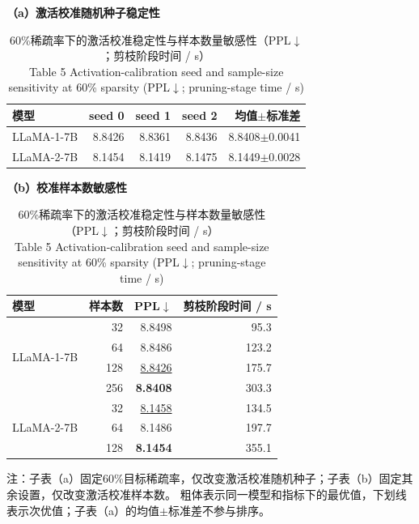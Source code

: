 \documentclass[UTF8,fontset=fandol]{ctexart}
\renewcommand{\arraystretch}{1.08}
\newcommand{\best}[1]{\textbf{#1}}
\newcommand{\second}[1]{\underline{#1}}
\begin{document}
\begin{table}[!htbp]
\centering
\caption{60\%稀疏率下的激活校准稳定性与样本数量敏感性（PPL$\downarrow$；剪枝阶段时间 / s）\\
Table 5 Activation-calibration seed and sample-size sensitivity at 60\% sparsity (PPL$\downarrow$; pruning-stage time / s)}
\label{tab:stability}
\begin{minipage}{0.47\textwidth}
\centering
\scriptsize
\textbf{（a）激活校准随机种子稳定性}\par\vspace{2pt}
\setlength{\tabcolsep}{3.2pt}
\renewcommand{\arraystretch}{0.98}
\begin{tabular}{lrrrr}
\toprule
模型 & seed 0 & seed 1 & seed 2 & 均值$\pm$标准差 \\
\midrule
LLaMA-1-7B & 8.8426 & 8.8361 & 8.8436 & 8.8408$\pm$0.0041 \\
LLaMA-2-7B & 8.1454 & 8.1419 & 8.1475 & 8.1449$\pm$0.0028 \\
\bottomrule
\end{tabular}
\end{minipage}
\hfill
\begin{minipage}{0.49\textwidth}
\centering
\scriptsize
\textbf{（b）校准样本数敏感性}\par\vspace{2pt}
\setlength{\tabcolsep}{4.2pt}
\renewcommand{\arraystretch}{0.96}
\begin{tabular}{lrrr}
\toprule
模型 & 样本数 & PPL$\downarrow$ & 剪枝阶段时间 / s \\
\midrule
\multirow{4}{*}{LLaMA-1-7B}
 & 32  & 8.8498 & 95.3 \\
 & 64  & 8.8486 & 123.2 \\
 & 128 & \second{8.8426} & 175.7 \\
 & 256 & \best{8.8408} & 303.3 \\
\midrule
\multirow{3}{*}{LLaMA-2-7B}
 & 32  & \second{8.1458} & 134.5 \\
 & 64  & 8.1486 & 197.7 \\
 & 128 & \best{8.1454} & 355.1 \\
\bottomrule
\end{tabular}
\end{minipage}
\vspace{2pt}
\parbox{0.96\textwidth}{\scriptsize
注：子表（a）固定60\%目标稀疏率，仅改变激活校准随机种子；子表（b）固定其余设置，仅改变激活校准样本数。
粗体表示同一模型和指标下的最优值，下划线表示次优值；子表（a）的均值$\pm$标准差不参与排序。}
\end{table}
\end{document}
